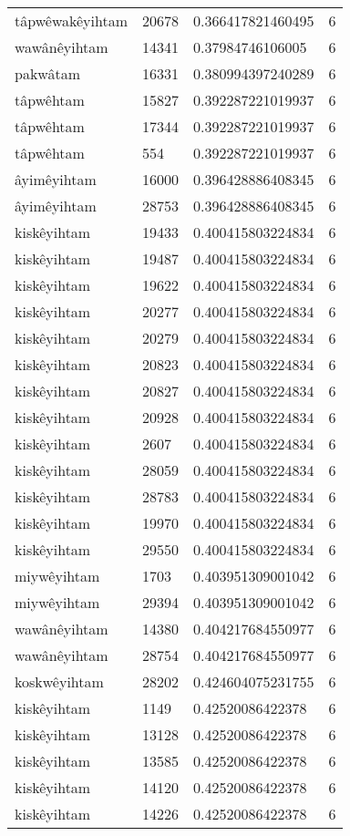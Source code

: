 \begin{longtable}{llll}
tâpwêwakêyihtam & 20678 & 0.366417821460495 & 6 \\
wawânêyihtam & 14341 & 0.37984746106005 & 6 \\
pakwâtam & 16331 & 0.380994397240289 & 6 \\
tâpwêhtam & 15827 & 0.392287221019937 & 6 \\
tâpwêhtam & 17344 & 0.392287221019937 & 6 \\
tâpwêhtam & 554 & 0.392287221019937 & 6 \\
âyimêyihtam & 16000 & 0.396428886408345 & 6 \\
âyimêyihtam & 28753 & 0.396428886408345 & 6 \\
kiskêyihtam & 19433 & 0.400415803224834 & 6 \\
kiskêyihtam & 19487 & 0.400415803224834 & 6 \\
kiskêyihtam & 19622 & 0.400415803224834 & 6 \\
kiskêyihtam & 20277 & 0.400415803224834 & 6 \\
kiskêyihtam & 20279 & 0.400415803224834 & 6 \\
kiskêyihtam & 20823 & 0.400415803224834 & 6 \\
kiskêyihtam & 20827 & 0.400415803224834 & 6 \\
kiskêyihtam & 20928 & 0.400415803224834 & 6 \\
kiskêyihtam & 2607 & 0.400415803224834 & 6 \\
kiskêyihtam & 28059 & 0.400415803224834 & 6 \\
kiskêyihtam & 28783 & 0.400415803224834 & 6 \\
kiskêyihtam & 19970 & 0.400415803224834 & 6 \\
kiskêyihtam & 29550 & 0.400415803224834 & 6 \\
miywêyihtam & 1703 & 0.403951309001042 & 6 \\
miywêyihtam & 29394 & 0.403951309001042 & 6 \\
wawânêyihtam & 14380 & 0.404217684550977 & 6 \\
wawânêyihtam & 28754 & 0.404217684550977 & 6 \\
koskwêyihtam & 28202 & 0.424604075231755 & 6 \\
kiskêyihtam & 1149 & 0.42520086422378 & 6 \\
kiskêyihtam & 13128 & 0.42520086422378 & 6 \\
kiskêyihtam & 13585 & 0.42520086422378 & 6 \\
kiskêyihtam & 14120 & 0.42520086422378 & 6 \\
kiskêyihtam & 14226 & 0.42520086422378 & 6 \\

\end{longtable}
